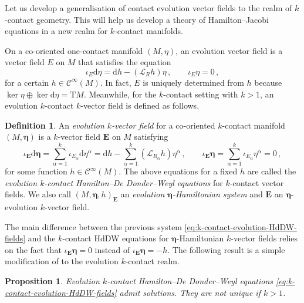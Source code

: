 \documentclass[11pt,twoside]{article}
\theoremstyle{plain}
\newtheorem{proposition}[theorem]{Proposition} \newtheorem{corollary}[theorem]{Corollary}
\theoremstyle{definition}
\newtheorem{definition}[theorem]{Definition}
\theoremstyle{remark}
\newcommand{\dd}{\mathrm{d}}
\renewcommand{\d}{\mathrm{d}}
\newcommand{\Cinfty}{\mathscr{C}^\infty}
\newcommand{\T}{\mathrm{T}}
\newcommand*{\inn}[1]{\iota_{#1}}
\newcommand{\Lie}{\mathscr{L}}
\begin{document}
Let us develop a generalisation of contact evolution vector fields \cite{LL_19} to the realm of $k$-contact geometry. This will help us develop a theory of Hamilton--Jacobi equations in a new realm for $k$-contact manifolds. 

On a co-oriented one-contact manifold $(M,\eta)$, an evolution vector field is a vector field $E$ on $M$ that satisfies the equation
\[
\iota_E\dd\eta = \dd h - (\Lie_R h)\eta\,, \qquad \iota_E\eta = 0\,,
\]
for a certain $h\in \Cinfty(M)$. In fact, $E$ is uniquely determined from $h$ because $\ker \eta\oplus\ker \d\eta=\T M$. 
Meanwhile, for the $k$-contact setting with $k>1$, an evolution $k$-contact $k$-vector field is defined as follows. 

\begin{definition}
An {\it evolution $k$-vector field} for a co-oriented $k$-contact manifold $(M,\bm \eta)$ is a $k$-vector field ${\bm E}$ on $M$ satisfying
\begin{equation}\label{eq:k-contact-evolution-HdDW-fields}
\iota_{\bm E}\dd\bm\eta=\sum_{\alpha=1}^k\inn{E_\alpha}\dd\eta^\alpha = \dd h - \sum_{\alpha=1}^k(\Lie_{R_\alpha}h)\eta^\alpha\,,\qquad
\iota_{\bm E}\bm \eta=\sum_{\alpha=1}^k\inn{E_\alpha}\eta^\alpha = 0\,,
\end{equation}
for some function $h\in \Cinfty (M)$. The above equations for a fixed $h$ are called the {\it evolution $k$-contact Hamilton--De Donder--Weyl equations} for $k$-contact vector fields. We also call $(M,\bm \eta,h)_{\bm E}$ an {\it evolution ${\bm \eta}$-Hamiltonian system} and ${\bm E}$ an $\bm \eta$-evolution $k$-vector field.
\end{definition}

The main difference between the previous system \eqref{eq:k-contact-evolution-HdDW-fields} and the $k$-contact HdDW equations for ${\bm \eta}$-Hamiltonian $k$-vector fields relies on the fact that $\iota_{\bm E}\bm \eta=0$ instead of $\iota_{\bm E}\bm \eta=-h$. The following result is a simple modification of \cite[Proposition 3.5]{HLM_26} to the evolution $k$-contact realm.



\begin{proposition}\label{prop:k-contact-evolution-HdDW-have-solutions}
Evolution $k$-contact Hamilton--De Donder--Weyl equations \eqref{eq:k-contact-evolution-HdDW-fields} admit solutions. They are not unique if $k > 1$.
\end{proposition}
\end{document}
